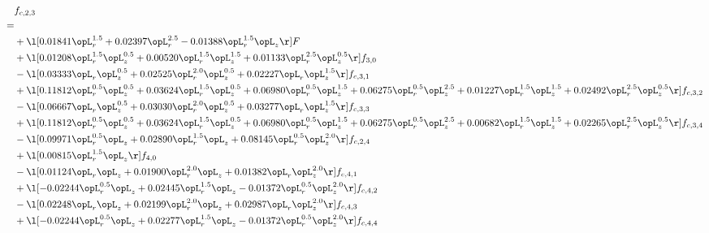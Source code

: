 \begin{alignat}{2} 
\label{eq:f_23_2} 
& f_{c,2,3} \nonumber \\ 
 = \\ 
& + \l[  0.01841 \opL_r^{1.5} +  0.02397 \opL_r^{2.5}   -0.01388 \opL_r^{1.5} \opL_z  \r] F \nonumber \\ 
& + \l[  0.01208 \opL_r^{1.5} \opL_z^{0.5} +  0.00520 \opL_r^{1.5} \opL_z^{1.5} +  0.01133 \opL_r^{2.5} \opL_z^{0.5}  \r] f_{3,0} \nonumber \\ 
& - \l[  0.03333 \opL_r \opL_z^{0.5} +  0.02525 \opL_r^{2.0} \opL_z^{0.5} +  0.02227 \opL_r \opL_z^{1.5}  \r] f_{c,3,1} \nonumber \\ 
& + \l[  0.11812 \opL_r^{0.5} \opL_z^{0.5} +  0.03624 \opL_r^{1.5} \opL_z^{0.5} +  0.06980 \opL_r^{0.5} \opL_z^{1.5} +  0.06275 \opL_r^{0.5} \opL_z^{2.5} +  0.01227 \opL_r^{1.5} \opL_z^{1.5} +  0.02492 \opL_r^{2.5} \opL_z^{0.5}  \r] f_{c,3,2} \nonumber \\ 
& - \l[  0.06667 \opL_r \opL_z^{0.5} +  0.03030 \opL_r^{2.0} \opL_z^{0.5} +  0.03277 \opL_r \opL_z^{1.5}  \r] f_{c,3,3} \nonumber \\ 
& + \l[  0.11812 \opL_r^{0.5} \opL_z^{0.5} +  0.03624 \opL_r^{1.5} \opL_z^{0.5} +  0.06980 \opL_r^{0.5} \opL_z^{1.5} +  0.06275 \opL_r^{0.5} \opL_z^{2.5} +  0.00682 \opL_r^{1.5} \opL_z^{1.5} +  0.02265 \opL_r^{2.5} \opL_z^{0.5}  \r] f_{c,3,4} \nonumber \\ 
& - \l[  0.09971 \opL_r^{0.5} \opL_z +  0.02890 \opL_r^{1.5} \opL_z +  0.08145 \opL_r^{0.5} \opL_z^{2.0}  \r] f_{c,2,4} \nonumber \\ 
& + \l[  0.00815 \opL_r^{1.5} \opL_z  \r] f_{4,0} \nonumber \\ 
& - \l[  0.01124 \opL_r \opL_z +  0.01900 \opL_r^{2.0} \opL_z +  0.01382 \opL_r \opL_z^{2.0}  \r] f_{c,4,1} \nonumber \\ 
& + \l[  -0.02244 \opL_r^{0.5} \opL_z +  0.02445 \opL_r^{1.5} \opL_z   -0.01372 \opL_r^{0.5} \opL_z^{2.0}  \r] f_{c,4,2} \nonumber \\ 
& - \l[  0.02248 \opL_r \opL_z +  0.02199 \opL_r^{2.0} \opL_z +  0.02987 \opL_r \opL_z^{2.0}  \r] f_{c,4,3} \nonumber \\ 
& + \l[  -0.02244 \opL_r^{0.5} \opL_z +  0.02277 \opL_r^{1.5} \opL_z   -0.01372 \opL_r^{0.5} \opL_z^{2.0}  \r] f_{c,4,4} \nonumber \\ 
\end{alignat} 


